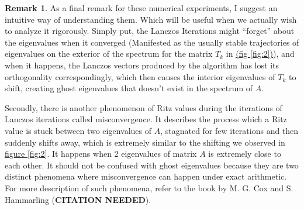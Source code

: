 \documentclass[]{article}
\theoremstyle{definition}
\newtheorem{remark}{Remark}[subsection]  %
\begin{document}
            \begin{remark}
                As a final remark for these numerical experiments, I suggest an intuitive way of understanding them. Which will be useful when we actually wish to analyze it rigorously. Simply put, the Lanczos Iterations might ``forget'' about the eigenvalues when it converged (Manifested as the usually stable trajectories of eigenvalues on the exterior of the spectrum for the matrix $T_k$ in \hyperref[fig:2]{(fig \ref*{fig:2})}), and when it happens, the Lanczos vectors produced by the algorithm has lost its orthogonality correspondingly, which then causes the interior eigenvalues of $T_k$ to shift, creating ghost eigenvalues that doesn't exist in the spectrum of $A$. 
                \par
                Secondly, there is another phenomenon of Ritz values during the iterations of Lanczos iterations called misconvergence. It describes the process which a Ritz value is stuck between two eigenvalues of $A$, stagnated for few iterations and then suddenly shifts away, which is extremely similar to the shifting we observed in \hyperref[fig:2]{figure \ref*{fig:2}}. It happens when 2 eigenvalues of matrix $A$ is extremely close to each other. It should not be confused with ghost eigenvalues because they are two distinct phenomena where misconvergence can happen under exact arithmetic. For more description of such phenomena, refer to the book by M. G. Cox and S. Hammarling (\textbf{CITATION NEEDED}). 
            \end{remark}
\end{document}
